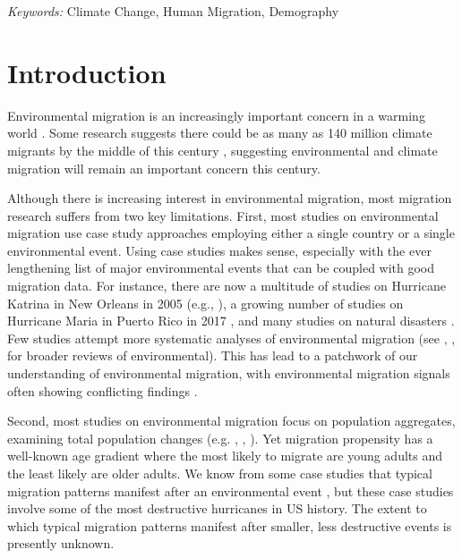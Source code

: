 \documentclass[12pt]{article}
\begin{document}
\noindent%
{\it Keywords:} Climate Change, Human Migration, Demography
\vfill

\newpage
{} %

\newpage

\hypertarget{introduction}{%
\section{Introduction}\label{introduction}}

Environmental migration is an increasingly important concern in a
warming world
\citep{blackClimateChangeMigration2011, findlayMigrantDestinationsEra2011, boas2019climate}.
Some research suggests there could be as many as 140 million climate
migrants by the middle of this century \citep{rigaud2018groundswell},
suggesting environmental and climate migration will remain an important
concern this century.

Although there is increasing interest in environmental migration, most
migration research suffers from two key limitations. First, most studies
on environmental migration use case study approaches employing either a
single country or a single environmental event. Using case studies makes
sense, especially with the ever lengthening list of major environmental
events that can be coupled with good migration data. For instance, there
are now a multitude of studies on Hurricane Katrina in New Orleans in
2005 (e.g.,
\citep{fussellRaceSocioeconomicStatus2010, fussellRecoveryMigrationCity2014, thiedeHurricaneKatrinaWho2013, groen2010going}),
a growing number of studies on Hurricane Maria in Puerto Rico in 2017
\citep{alexander2019impact, dewaard2020out, acosta2020quantifying}, and
many studies on natural disasters
\citep{kayastha1985flood, loebach2016household, paul2005evidence, mallick2014population}.
Few studies attempt more systematic analyses of environmental migration
(see \citet{obokata2014empirical}, \citet{hunter2015environmental},
\citet{hoffmann2020meta} for broader reviews of environmental). This has
lead to a patchwork of our understanding of environmental migration,
with environmental migration signals often showing conflicting findings
\citep{hoffmann2020meta}.

Second, most studies on environmental migration focus on population
aggregates, examining total population changes (e.g.
\citet{luUnveilingHiddenMigration2016}, \citet{hauer2020evacuees},
\citet{nawrotzki2013rainfall}). Yet migration propensity has a
well-known age gradient where the most likely to migrate are young
adults and the least likely are older adults. We know from some case
studies that typical migration patterns manifest after an environmental
event
\citep{thiedeHurricaneKatrinaWho2013, groen2010going, keenan2020resilience},
but these case studies involve some of the most destructive hurricanes
in US history. The extent to which typical migration patterns manifest
after smaller, less destructive events is presently unknown.
\end{document}
